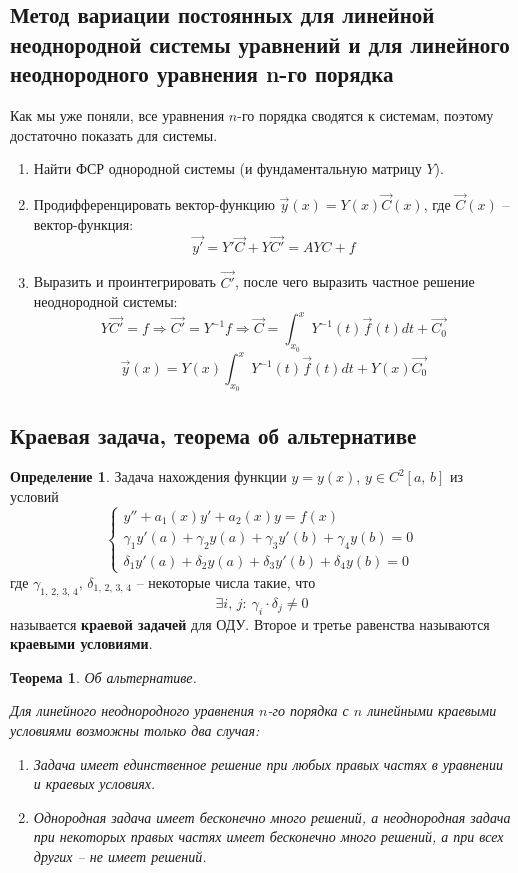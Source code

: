 \documentclass[a4paper,12pt]{article}
\theoremstyle{plain}
\newtheorem{theorem}{Теорема}[section]
\theoremstyle{definition}
\newtheorem{definition}{Определение}[section]
\theoremstyle{remark}
\begin{document}
\subsection{Метод вариации постоянных для линейной неоднородной системы уравнений и для линейного неоднородного уравнения n-го порядка}
Как мы уже поняли, все уравнения $n$-го порядка сводятся к системам, поэтому достаточно показать для системы.

\begin{enumerate}
	\item Найти ФСР однородной системы (и фундаментальную матрицу $Y$).
	\item Продифференцировать вектор-функцию $\vec{y}(x) = Y(x)\vec{C}(x)$, где $\vec{C}(x)$ -- вектор-функция:
	      \[\vec{y'} = Y'\vec{C} + Y\vec{C'} = AYC + f\]
	\item Выразить и проинтегрировать $\vec{C'}$, после чего выразить частное решение неоднородной системы:
	      \[Y\vec{C'} = f \Rightarrow \vec{C'} = Y^{-1}f \Rightarrow \vec{C} = \int_{x_0}^xY^{-1}(t)\vec{f}(t)dt + \vec{C_0}\]
	      \[\vec{y}(x) = Y(x)\int_{x_0}^xY^{-1}(t)\vec{f}(t)dt + Y(x)\vec{C_0}\]
\end{enumerate}

\subsection{Краевая задача, теорема об альтернативе}
\begin{definition}
	Задача нахождения функции $y = y(x),\, y \in C^2[a,\,b]$ из условий
	\[
		\begin{cases}
			y'' + a_1(x)y' + a_2(x)y = f(x)                                 \\
			\gamma_1y'(a) + \gamma_2y(a) + \gamma_3y'(b) + \gamma_4y(b) = 0 \\
			\delta_1y'(a) + \delta_2y(a) + \delta_3y'(b) + \delta_4y(b) = 0
		\end{cases}
	\]
	где $\gamma_{1,\,2,\,3,\,4},\, \delta_{1,\,2,\,3,\,4}$ -- некоторые числа такие, что
	\[\exists i,\, j:\: \gamma_i \cdot \delta_j \neq 0\]
	называется \textbf{краевой задачей} для ОДУ. Второе и третье равенства называются \textbf{краевыми условиями}.
\end{definition}

\begin{theorem}
	Об альтернативе.

	Для линейного неоднородного уравнения $n$-го порядка с $n$ линейными краевыми условиями возможны только два случая:
	\begin{enumerate}
		\item Задача имеет единственное решение при любых правых частях в уравнении и краевых условиях.
		\item Однородная задача имеет бесконечно много решений, а неоднородная задача при некоторых правых частях имеет бесконечно много решений, а при всех других -- не имеет решений.
	\end{enumerate}
\end{theorem}
\end{document}
